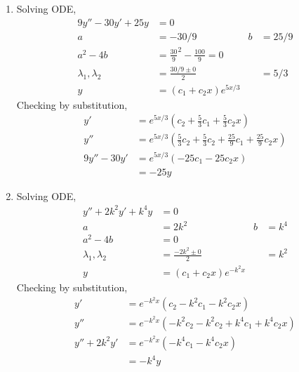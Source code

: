 \begin{enumerate}
    \item Solving ODE,
          \begin{align}
              9y'' - 30y' + 25y        & = 0                                      \\
              a                        & = -30/9                                &
              b                        & = 25/9                                   \\
              a^{2} - 4b               & = \frac{30}{9}^{2} - \frac{100}{9} = 0   \\
              \lambda_{1}, \lambda_{2} & = \frac{30/9 \pm 0}{2}                 &
                                       & = 5/3                                    \\
              y                        & = (c_{1}+ c_{2}x)e^{5x/3}
          \end{align}
          Checking by substitution,
          \begin{align}
              y'         & = e^{5x/3}\left( c_{2} + \frac{5}{3} c_{1}
              + \frac{5}{3} c_{2}x \right)                                        \\
              y''        & = e^{5x/3}\left( \frac{5}{3} c_{2} + \frac{5}{3} c_{2}
              + \frac{25}{9}c_{1} + \frac{25}{9}c_{2}x \right)                    \\
              9y''- 30y' & = e^{5x/3}(-25c_{1} - 25c_{2}x)                        \\
                         & = -25y
          \end{align}

    \item Solving ODE,
          \begin{align}
              y'' + 2k^{2}y' + k^{4}y  & = 0                            \\
              a                        & = 2k^{2}                     &
              b                        & = k^{4}                        \\
              a^{2} - 4b               & = 0                            \\
              \lambda_{1}, \lambda_{2} & = \frac{-2k^{2} \pm 0}{2}    &
                                       & = k^{2}                        \\
              y                        & = (c_{1}+ c_{2}x)e^{-k^{2}x}
          \end{align}
          Checking by substitution,
          \begin{align}
              y'            & = e^{-k^{2}x}( c_{2} - k^{2} c_{1} - k^{2} c_{2}x)     \\
              y''           & = e^{-k^{2}x}( -k^{2} c_{2} - k^{2} c_{2} + k^{4}c_{1}
              + k^{4}c_{2}x)                                                         \\
              y''+ 2k^{2}y' & = e^{-k^{2}x}(-k^{4}c_{1} - k^{4}c_{2}x)               \\
                            & = -k^{4}y
          \end{align}


\end{enumerate}
